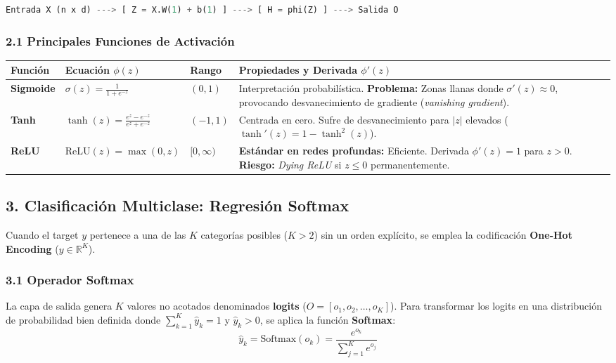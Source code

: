 \begin{lstlisting}[language=Python]
	Entrada X (n x d) ---> [ Z = X.W(1) + b(1) ] ---> [ H = phi(Z) ] ---> Salida O
\end{lstlisting}

\subsubsection{2.1 Principales Funciones de Activación}

\begin{table}[htbp]
	\centering
	\small
	\begin{tabular}{|p{2.5cm}|p{3.2cm}|p{2.2cm}|p{5cm}|}
		\hline
		\textbf{Función} & \textbf{Ecuación $\phi(z)$} & \textbf{Rango} & \textbf{Propiedades y Derivada $\phi'(z)$} \\ \hline
		\textbf{Sigmoide} & $\sigma(z) = \frac{1}{1 + e^{-z}}$ & $(0, 1)$ & Interpretación probabilística. \textbf{Problema:} Zonas llanas donde $\sigma'(z) \approx 0$, provocando desvanecimiento de gradiente (\emph{vanishing gradient}). \\ \hline
		\textbf{Tanh} & $\tanh(z) = \frac{e^z - e^{-z}}{e^z + e^{-z}}$ & $(-1, 1)$ & Centrada en cero. Sufre de desvanecimiento para $\vert z\vert$ elevados ($\tanh'(z) = 1 - \tanh^2(z)$). \\ \hline
		\textbf{ReLU} & $\text{ReLU}(z) = \max(0, z)$ & $[0, \infty)$ & \textbf{Estándar en redes profundas:} Eficiente. Derivada $\phi'(z) = 1$ para $z > 0$. \textbf{Riesgo:} \emph{Dying ReLU} si $z \le 0$ permanentemente. \\ \hline
	\end{tabular}
\end{table}

\subsection{3. Clasificación Multiclase: Regresión Softmax}

Cuando el target $y$ pertenece a una de las $K$ categorías posibles ($K > 2$) sin un orden explícito, se emplea la codificación \textbf{One-Hot Encoding} ($y \in \mathbb{R}^K$).

\subsubsection{3.1 Operador Softmax}

La capa de salida genera $K$ valores no acotados denominados \textbf{logits} ($O = [o_1, o_2, \dots, o_K]$). Para transformar los logits en una distribución de probabilidad bien definida donde $\sum_{k=1}^{K} \hat{y}_k = 1$ y $\hat{y}_k > 0$, se aplica la función \textbf{Softmax}:
$$\hat{y}_k = \text{Softmax}(o_k) = \frac{e^{o_k}}{\sum_{j=1}^{K} e^{o_j}}$$

